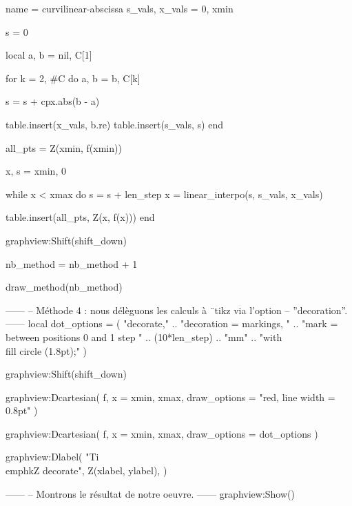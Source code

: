 \documentclass{standalone}
\begin{document}
\begin{luadraw}{name = curvilinear-abscissa}
s_vals, x_vals = {0}, {xmin}

s = 0

local a, b = nil, C[1]

for k = 2, #C do
  a, b = b, C[k]

  s = s + cpx.abs(b - a)

  table.insert(x_vals, b.re)
  table.insert(s_vals, s)
end

all_pts = {Z(xmin, f(xmin))}

x, s = xmin, 0

while x < xmax do
  s = s + len_step
  x = linear_interpo(s, s_vals, x_vals)

  table.insert(all_pts, Z(x, f(x)))
end

graphview:Shift(shift_down)

nb_method = nb_method + 1

draw_method(nb_method)

------
-- Méthode 4 : nous délèguons les calculs à ¨tikz via l'option
-- ''decoration''.
------
local dot_options = (
     "decorate,"
  .. "decoration = {markings, "
  .. "mark = between positions 0 and 1 step "
  .. (10*len_step) .. "mm"
  .. "with {\\fill circle (1.8pt);}}"
)

graphview:Shift(shift_down)

graphview:Dcartesian(
  f,
  {
    x = {xmin, xmax},
    draw_options = "red, line width = 0.8pt"
  }
)

graphview:Dcartesian(
  f,
  {
    x = {xmin, xmax},
    draw_options = dot_options
  }
)

graphview:Dlabel(
  "Ti\\emph{k}Z decorate", Z(xlabel, ylabel), {}
)

------
-- Montrons le résultat de notre oeuvre.
------
graphview:Show()
\end{luadraw}
\end{document}
